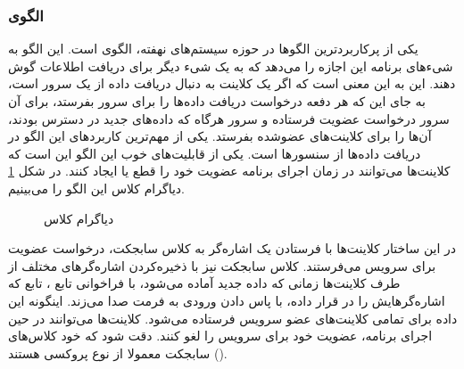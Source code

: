 \subsubsection{الگوی }
\label{HWObserverSec}
\begin{RTL}
یکی از پرکاربردترین الگوها در حوزه سیستم‌های نهفته، الگوی  \cite{ref1} است.
این الگو به شیء‌های برنامه این اجازه را می‌دهد که به یک شی‌ء دیگر برای دریافت
اطلاعات گوش دهند. این به این معنی است که اگر یک کلاینت به دنبال دریافت
داده از یک سرور است، به جای این که هر دفعه درخواست دریافت داده‌ها را برای
سرور بفرستد، برای آن سرور درخواست عضویت فرستاده و سرور هرگاه که داده‌های جدید
در دسترس بودند، آن‌ها را برای کلاینت‌های عضوشده بفرستد. یکی از مهم‌ترین کاربردهای
این الگو در دریافت داده‌ها از سنسورها است.
یکی از قابلیت‌های خوب این الگو این است که کلاینت‌ها می‌توانند در زمان اجرای برنامه
عضویت خود را قطع یا ایجاد کنند. در شکل \ref{HWObserverClassDiag}
دیاگرام کلاس این الگو را می‌بینیم.
\end{RTL}
\begin{figure}[h!]
\centering
{}
\caption{دیاگرام کلاس }
\label{HWObserverClassDiag}
\end{figure}
\begin{RTL}
در این ساختار کلاینت‌ها با فرستادن یک اشاره‌گر به کلاس سابجکت، درخواست عضویت برای 
سرویس می‌فرستند. کلاس سابجکت نیز با ذخیره‌کردن اشاره‌گرهای مختلف از طرف کلاینت‌ها
زمانی که داده جدید آماده می‌شود، با فراخوانی تابع ، تابع 
که اشاره‌گرهایش را در  قرار داده، با پاس دادن
ورودی به فرمت  صدا می‌زند. اینگونه این داده برای تمامی کلاینت‌های
عضو سرویس فرستاده می‌شود.
کلاینت‌ها می‌توانند در حین اجرای برنامه، عضویت خود برای سرویس را لغو کنند.
دقت شود که خود کلاس‌‌های سابجکت
معمولا از نوع پروکسی هستند ().
\end{RTL}
